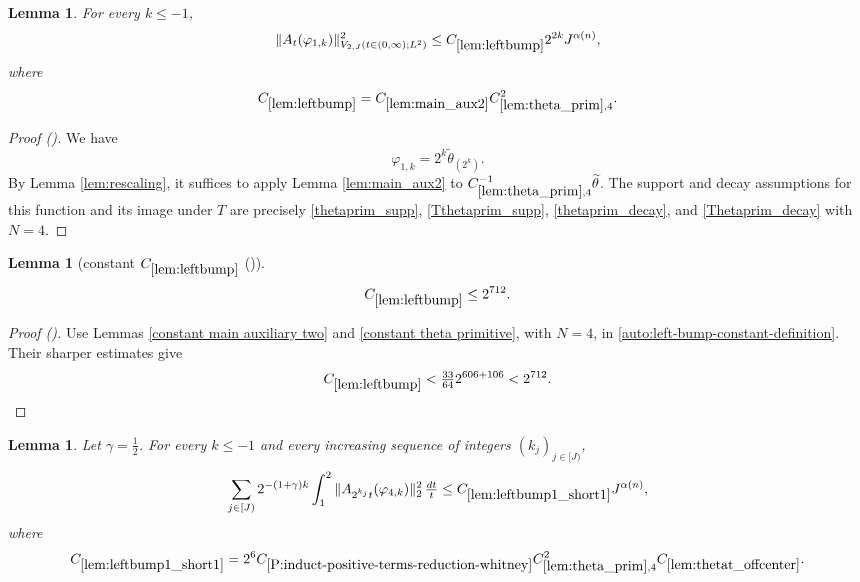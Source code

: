 \documentclass[12pt,reqno]{amsart}
\newcommand{\auto}{{({\tiny\faCar})}}
\theoremstyle{plain}
\newtheorem{lemma}[theorem]{Lemma}
\numberwithin{equation}{section}
\theoremstyle{remark}
\newcommand{\using}[1]{}
\begin{document}
\begin{lemma}\label{lem:leftbump}\using{lem:rescaling}\using{lem:main_aux2}\using{lem:theta_prim}
For every $k\le-1$,
\begin{equation}\label{leftbump}
\|A_t(\varphi_{1,k})\|_{V_{2,J}(t\in(0,\infty);L^2)}^2
\le C_{\ref{lem:leftbump}}2^{2k}J^{\alpha(n)},
\end{equation}
where
\begin{equation}\label{auto:left-bump-constant-definition}
C_{\ref{lem:leftbump}}
=C_{\ref{lem:main_aux2}}C_{\ref{lem:theta_prim},4}^2.
\end{equation}
\end{lemma}

\begin{proof}[Proof \auto]
We have
\[
\varphi_{1,k}=2^k\widetilde\theta_{(2^k)}.
\]
By Lemma \ref{lem:rescaling}, it suffices to apply Lemma \ref{lem:main_aux2} to $C_{\ref{lem:theta_prim},4}^{-1}\widetilde\theta$. The support and decay assumptions for this function and its image under $T$ are precisely \eqref{thetaprim_supp}, \eqref{Tthetaprim_supp}, \eqref{thetaprim_decay}, and \eqref{Thetaprim_decay} with $N=4$.
\end{proof}

\begin{lemma}[constant $C_{\ref{lem:leftbump}}$ \auto]\label{constant left bump}\using{constant main auxiliary two}\using{constant theta primitive}\using{lem:leftbump}
\begin{equation}\label{constant left bump bound}
C_{\ref{lem:leftbump}}\le2^{712}.
\end{equation}
\end{lemma}
\begin{proof}[Proof \auto]
Use Lemmas \ref{constant main auxiliary two} and \ref{constant theta primitive}, with $N=4$, in \eqref{auto:left-bump-constant-definition}. Their sharper estimates give
\[
C_{\ref{lem:leftbump}}<\tfrac{33}{64}2^{606+106}<2^{712}.
\]
\end{proof}


\begin{lemma}\label{lem:leftbump1_short1}\using{A to Lambda}\using{lem:theta_prim}\using{lem:thetat_offcenter}\using{P:induct-positive-terms-reduction-whitney}\using{lem:int_fct}\using{lem:phi4_supp}\using{P:induct-positive-terms-reduction-whitney-gap}
Let $\gamma=\frac12$. For every $k\le-1$ and every increasing sequence of integers $(k_j)_{j\in[J)}$,
\begin{equation}\label{auto:left-bump-one-short-one-bound}
\sum_{j\in[J)}2^{-(1+\gamma)k}\int_1^2
\|A_{2^{k_j}t}(\varphi_{4,k})\|_2^2\,\tfrac{dt}{t}
\le C_{\ref{lem:leftbump1_short1}}J^{\alpha(n)},
\end{equation}
where
\begin{equation}\label{auto:left-bump-one-short-one-constant-definition}
C_{\ref{lem:leftbump1_short1}}
=2^6C_{\ref{P:induct-positive-terms-reduction-whitney}}
C_{\ref{lem:theta_prim},4}^2C_{\ref{lem:thetat_offcenter}}.
\end{equation}
\end{lemma}
\end{document}
